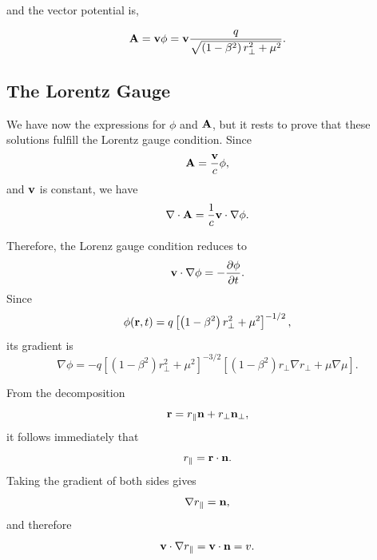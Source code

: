 \documentclass[12pt]{article}
\begin{document}
and the vector potential is,

\begin{equation}
  {\vb A} = {\vb v} \phi = {\vb v} \frac{
    q
  }{
    \sqrt{
      \left(1-\beta^2\right)r_\perp^2
      +
      \mu^2
    }
  }.
  \label{eq:vector_potential_uniform_motion}
\end{equation}

\subsection{The Lorentz Gauge}

We have now the expressions for $\phi$ and $\vb A$, but it rests to prove that these solutions fulfill the Lorentz
gauge condition.
Since
\begin{equation}
  \vb A=\frac{\vb v}{c}\phi,
\end{equation}
and $\vb v$ is constant, we have
\begin{equation}
  \nabla\cdot\vb A
  =
  \frac{1}{c}\vb v\cdot\nabla\phi.
\end{equation}

Therefore, the Lorenz gauge condition reduces to
\begin{equation}
  \vb v\cdot\nabla\phi
  =
  -
  \frac{\partial\phi}{\partial t}.
  \label{eq:lorenz_gauge_scalar_potential_condition}
\end{equation}
Since
\begin{equation}
  \phi(\vb r,t)
  =
  q
  \left[
    \left(1-\beta^2\right)r_\perp^2
    +
    \mu^2
  \right]^{-1/2},
\end{equation}
its gradient is
\begin{equation}
  \nabla\phi
  =
  -
  q
  \left[
    \left(1-\beta^2\right)r_\perp^2
    +
    \mu^2
  \right]^{-3/2}
  \left[
    \left(1-\beta^2\right)
    r_\perp\nabla r_\perp
    +
    \mu\nabla\mu
  \right].
\end{equation}

From the decomposition
\begin{equation}
  \vb r
  =
  r_\parallel\vb n
  +
  r_\perp\vb n_\perp,
\end{equation}
it follows immediately that
\begin{equation}
  r_\parallel
  =
  \vb r\cdot\vb n.
\end{equation}
Taking the gradient of both sides gives
\begin{equation}
  \nabla r_\parallel
  =
  \vb n,
\end{equation}
and therefore
\begin{equation}
  \vb v\cdot\nabla r_\parallel
  =
  \vb v\cdot\vb n
  =
  v.
\end{equation}
\end{document}
